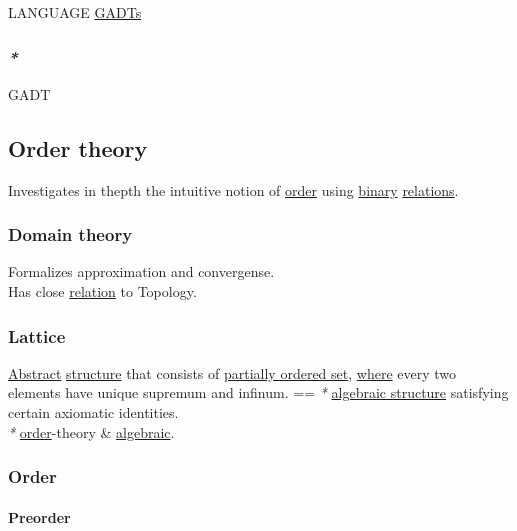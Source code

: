 \documentclass[11pt]{article}
\begin{document}
LANGUAGE \hyperref[org7f1cfa8]{GADTs}\\

\subsubsection{\emph{*}}
\label{sec:org9ea3c0d}

\label{org47552c1}GADT\\

\subsection{\label{org6e67d1a}Order theory}
\label{sec:org98c169e}

Investigates in thepth the intuitive notion of \hyperref[orgc0a359b]{order} using \hyperref[org57bd48f]{binary} \hyperref[org711476e]{relations}.\\

\subsubsection{\label{org2146d29}Domain theory}
\label{sec:org35294a2}

Formalizes approximation and convergense.\\
Has close \hyperref[orga5705a9]{relation} to Topology.\\

\subsubsection{\label{org4f41cae}Lattice}
\label{sec:org490b42f}

\hyperref[orgbbe9132]{Abstract} \hyperref[org8051f61]{structure} that consists of \hyperref[org393daf8]{partially ordered set}, \hyperref[org3e5903d]{where} every two elements have unique supremum and infinum. == \emph{*} \hyperref[org2ee73e8]{algebraic structure} satisfying certain axiomatic identities.\\
\emph{*} \hyperref[orgc0a359b]{order}-theory \& \hyperref[orge9081c5]{algebraic}.\\

\subsubsection{\label{orgc0a359b}Order}
\label{sec:org9fe0d5f}

\paragraph{\label{orga8d7c22}Preorder}
\label{sec:org4acf7eb}
\end{document}
